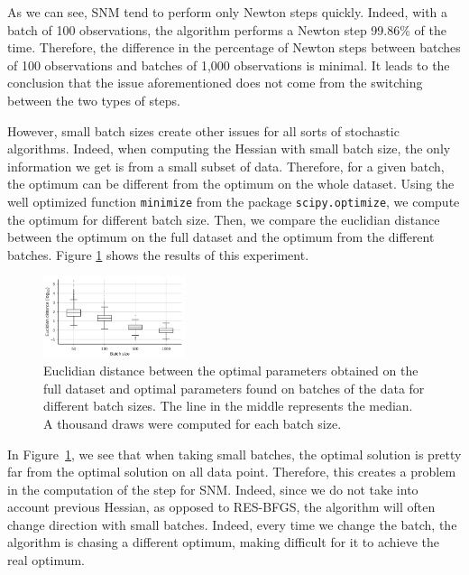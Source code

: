 \documentclass[conference]{IEEEtran}
\begin{document}
As we can see, SNM tend to perform only Newton steps quickly. Indeed, with a batch of 100 observations, the algorithm performs a Newton step 99.86\% of the time. Therefore, the difference in the percentage of Newton steps between batches of 100 observations and batches of 1,000 observations is minimal. It leads to the conclusion that the issue aforementioned does not come from the switching between the two types of steps.

However, small batch sizes create other issues for all sorts of stochastic algorithms. Indeed, when computing the Hessian with small batch size, the only information we get is from a small subset of data. Therefore, for a given batch, the optimum can be different from the optimum on the whole dataset. Using the well optimized function \texttt{minimize} from the package \texttt{scipy.optimize}, we compute the optimum for different batch size. Then, we compare the euclidian distance between the optimum on the full dataset and the optimum from the different batches. Figure \ref{fig:batch_dist} shows the results of this experiment.

\begin{figure}[t]
\centering
\includegraphics[width=0.37\textwidth]{../figures/dist.pdf}
\vspace{-0.3cm}
\caption{Euclidian distance between the optimal parameters obtained on the full dataset and optimal parameters found on batches of the data for different batch sizes. The line in the middle represents the median. A thousand draws were computed for each batch size.}
\label{fig:batch_dist}
\vspace{-0.5cm}
\end{figure}

In Figure~\ref{fig:batch_dist}, we see that when taking small batches, the optimal solution is pretty far from the optimal solution on all data point. Therefore, this creates a problem in the computation of the step for SNM. Indeed, since we do not take into account previous Hessian, as opposed to RES-BFGS, the algorithm will often change direction with small batches. Indeed, every time we change the batch, the algorithm is chasing a different optimum, making difficult for it to achieve the real optimum. 
\end{document}
